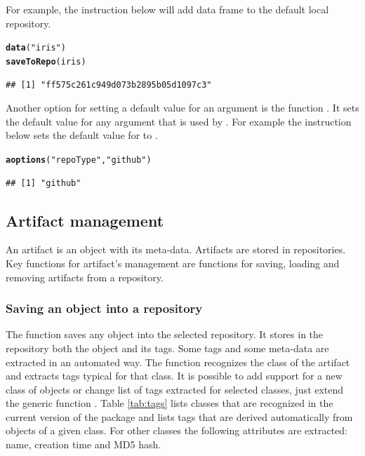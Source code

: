 \documentclass[nojss]{jss}\usepackage[]{graphicx}\usepackage[]{color}
\makeatletter
\newcommand{\hlstr}[1]{\textcolor[rgb]{0.192,0.494,0.8}{#1}}%
\newcommand{\hlstd}[1]{\textcolor[rgb]{0.345,0.345,0.345}{#1}}%
\newcommand{\hlkwd}[1]{\textcolor[rgb]{0.737,0.353,0.396}{\textbf{#1}}}%
\newenvironment{kframe}{%
 \def\at@end@of@kframe{}%
 \ifinner\ifhmode%
  \def\at@end@of@kframe{\end{minipage}}%
  \begin{minipage}{\columnwidth}%
 \fi\fi%
 \def\FrameCommand##1{\hskip\@totalleftmargin \hskip-\fboxsep
 \colorbox{shadecolor}{##1}\hskip-\fboxsep
     \hskip-\linewidth \hskip-\@totalleftmargin \hskip\columnwidth}%
 \MakeFramed {\advance\hsize-\width
   \@totalleftmargin\z@ \linewidth\hsize
   \@setminipage}}%
 {\par\unskip\endMakeFramed%
 \at@end@of@kframe}
\newenvironment{knitrout}{}{} %
\makeatother
\begin{document}
For example, the instruction below will add  data frame to the default local repository.

\begin{knitrout}
\color{fgcolor}\begin{kframe}
\begin{alltt}
\hlkwd{data}\hlstd{(}\hlstr{"iris"}\hlstd{)}
\hlkwd{saveToRepo}\hlstd{(iris)}
\end{alltt}
\begin{verbatim}
## [1] "ff575c261c949d073b2895b05d1097c3"
\end{verbatim}
\end{kframe}
\end{knitrout}


Another option for setting a default value for an argument is the function . It sets the default value for any argument that is used by . For example the instruction below sets the default value for  to .
\begin{knitrout}
\color{fgcolor}\begin{kframe}
\begin{alltt}
\hlkwd{aoptions}\hlstd{(}\hlstr{"repoType"}\hlstd{,} \hlstr{"github"}\hlstd{)}
\end{alltt}
\begin{verbatim}
## [1] "github"
\end{verbatim}
\end{kframe}
\end{knitrout}



\subsection{Artifact management}
\label{sec:art32}

An artifact is an  object with its meta-data. Artifacts are stored in repositories. Key functions for artifact's management are functions for saving, loading and removing artifacts from a repository. 

\subsubsection[Saving an R object into a repository]{Saving an  object into a repository}

The  function saves any  object into the selected repository. It stores in the repository both the object and its tags. 
Some tags and some {meta-data} are extracted in an automated way. The  function recognizes the class of the artifact and extracts tags typical for that class. It is possible to add support for a new class of objects or change list of tags extracted for selected classes, just extend the generic function . Table \ref{tab:tags} lists classes that are recognized in the current version of the package and lists tags that are derived automatically from objects of a given class. For other classes the following attributes are extracted: name, creation time and MD5 hash.
\end{document}
